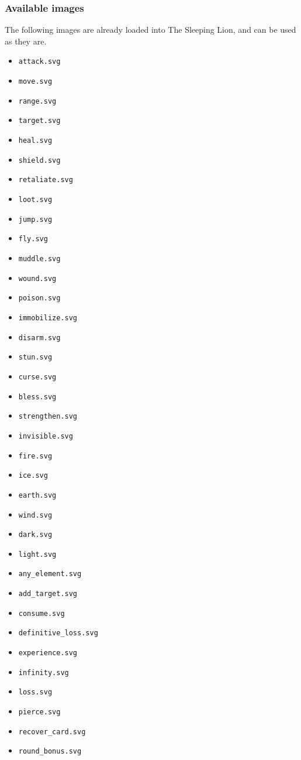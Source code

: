 \documentclass{article}
\begin{document}
\subsubsection{Available images}
The following images are already loaded into The Sleeping Lion, and can be used as they are.
\begin{multicols}{2}
\begin{itemize}
\item \verb`attack.svg`
\item \verb`move.svg`
\item \verb`range.svg`
\item \verb`target.svg`
\item \verb`heal.svg`
\item \verb`shield.svg`
\item \verb`retaliate.svg`
\item \verb`loot.svg`
\item \verb`jump.svg`
\item \verb`fly.svg`
\item \verb`muddle.svg`
\item \verb`wound.svg`
\item \verb`poison.svg`
\item \verb`immobilize.svg`
\item \verb`disarm.svg`
\item \verb`stun.svg`
\item \verb`curse.svg`
\item \verb`bless.svg`
\item \verb`strengthen.svg`
\item \verb`invisible.svg`
\item \verb`fire.svg`
\item \verb`ice.svg`
\item \verb`earth.svg`
\item \verb`wind.svg`
\item \verb`dark.svg`
\item \verb`light.svg`
\item \verb`any_element.svg`
\item \verb`add_target.svg`
\item \verb`consume.svg`
\item \verb`definitive_loss.svg`
\item \verb`experience.svg`
\item \verb`infinity.svg`
\item \verb`loss.svg`
\item \verb`pierce.svg`
\item \verb`recover_card.svg`
\item \verb`round_bonus.svg`
\end{itemize}
\end{multicols}
\end{document}
